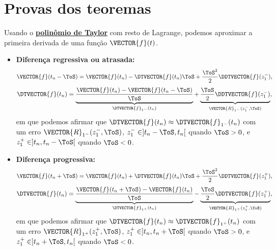 \section{Provas dos teoremas}


\begin{myproofT}\label{proof:teo:diferenças-finitas:1}
Usando o \hyperref[prop:polytaylor]{\textbf{polinômio de Taylor}} com resto de Lagrange, podemos aproximar 
a primeira derivada de uma função $\VECTOR{f}(t)$.
\begin{itemize}
\item \textbf{Diferença regressiva ou atrasada:}
\begin{equation}
\VECTOR{f}(t_n-\ToS) = \VECTOR{f}(t_n)-\DTVECTOR{f}(t_n)\ToS +\frac{\ToS^2}{2}\DDTVECTOR{f}(z_{1}^{-}),
\end{equation}
\begin{equation}
\DTVECTOR{f}(t_n)=\underbrace{\frac{\VECTOR{f}(t_n)-\VECTOR{f}(t_n-\ToS)}{\ToS}}_{\DTVECTOR{f}_{1^{-}}(t_n)}+
\underbrace{\frac{\ToS}{2}\DDTVECTOR{f}(z_{1}^{-})}_{\VECTOR{R}_{1^{-}}(z_{1}^{-},\ToS)},
\end{equation}
em que podemos afirmar que $\DTVECTOR{f}(t_n)\approx \DTVECTOR{f}_{1^{-}}(t_n)$ com um erro $\VECTOR{R}_{1^{-}}(z_{1}^{-},\ToS)$,
$z_{1}^{-} \in ]t_n-\ToS,t_n[$ quando $\ToS>0$, e $z_{1}^{+} \in ]t_n,t_n-\ToS[$ quando $\ToS<0$.

\item \textbf{Diferença progressiva:}
\begin{equation}
\VECTOR{f}(t_n+\ToS) = \VECTOR{f}(t_n)+\DTVECTOR{f}(t_n)\ToS +\frac{\ToS^2}{2}\DDTVECTOR{f}(z_{1}^{+}),
\end{equation}
\begin{equation}
\DTVECTOR{f}(t_n)=\underbrace{\frac{\VECTOR{f}(t_n+\ToS) - \VECTOR{f}(t_n)}{\ToS}}_{\DTVECTOR{f}_{1^{+}}(t_n)}-
\underbrace{\frac{\ToS}{2}\DDTVECTOR{f}(z_{1}^{+})}_{\VECTOR{R}_{1^{+}}(z_{1}^{+},\ToS)},
\end{equation}
em que podemos afirmar que $\DTVECTOR{f}(t_n)\approx \DTVECTOR{f}_{1^{+}}(t_n)$ com um erro $\VECTOR{R}_{1^{+}}(z_{1}^{+},\ToS)$,
$z_{1}^{+} \in ]t_n,t_n+\ToS[$ quando $\ToS>0$, e $z_{1}^{+} \in ]t_n+\ToS,t_n[$ quando $\ToS<0$.


\end{itemize}
\end{myproofT}

